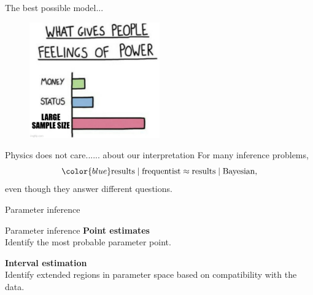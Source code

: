 \documentclass[
aspectratio=169,
14pt,
professionalfonts
]{beamer}
\begin{document}
\begin{frame}[noframenumbering]{The best possible model...}
    \begin{figure}
        \includegraphics[width=0.5\textwidth]{../plots/sample_size.jpg}
    \end{figure}
\end{frame}

\begin{frame}{Physics does not care...}{... about our interpretation}
For many inference problems, 
$$\color{blue}
\text{results} \mid \text{frequentist} \approx \text{results} \mid \text{Bayesian},
$$
even though they answer different questions.

\vspace{0.5cm}

\end{frame}

\begin{frame}
\center
\Large
Parameter inference
\end{frame}

\begin{frame}{Parameter inference}
    \center
    \textbf{Point estimates}\\
    Identify the most probable parameter point.

    \vspace{1cm}

    \textbf{Interval estimation}\\
    Identify extended regions in parameter space based on compatibility with the data.
\end{frame}
\end{document}
